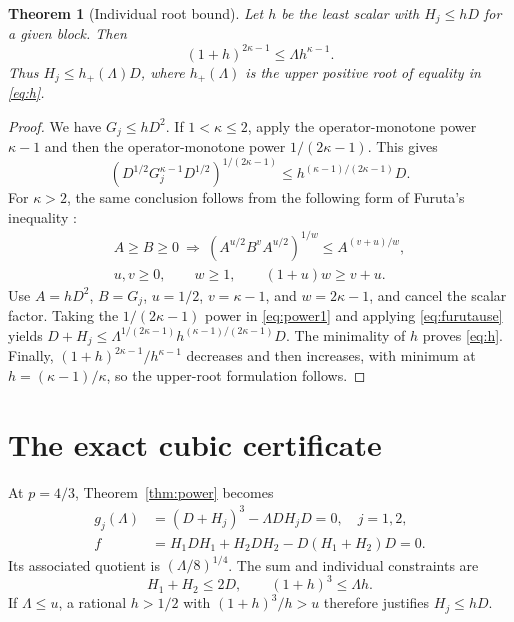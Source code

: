 \documentclass[11pt]{article}
\newtheorem{theorem}{Theorem}[section]
\theoremstyle{remark}\newtheorem{remark}[theorem]{Remark}
\begin{document}
\begin{theorem}[Individual root bound]\label{thm:individual}
Let \(h\) be the least scalar with \(H_j\le hD\) for a given block. Then
\begin{equation}\label{eq:h}
 (1+h)^{2\kappa-1}\le\Lambda h^{\kappa-1}.
\end{equation}
Thus \(H_j\le h_+(\Lambda)D\), where \(h_+(\Lambda)\) is the upper positive root of equality in \eqref{eq:h}.
\end{theorem}
\begin{proof}
We have \(G_j\le hD^2\). If \(1<\kappa\le2\), apply the operator-monotone power \(\kappa-1\) and then the operator-monotone power \(1/(2\kappa-1)\). This gives
\begin{equation}\label{eq:furutause}
 (D^{1/2}G_j^{\kappa-1}D^{1/2})^{1/(2\kappa-1)}
 \le h^{(\kappa-1)/(2\kappa-1)}D.
\end{equation}
For \(\kappa>2\), the same conclusion follows from the following form of Furuta's inequality \cite[Theorem F(ii)]{furuta}:
\[
 \begin{gathered}
 A\ge B\ge0\ \Longrightarrow\
 (A^{u/2}B^vA^{u/2})^{1/w}\le A^{(v+u)/w},\\
 u,v\ge0,\qquad w\ge1,\qquad(1+u)w\ge v+u.
 \end{gathered}
\]
Use \(A=hD^2\), \(B=G_j\), \(u=1/2\), \(v=\kappa-1\), and \(w=2\kappa-1\), and cancel the scalar factor. Taking the \(1/(2\kappa-1)\) power in \eqref{eq:power1} and applying \eqref{eq:furutause} yields
\(D+H_j\le\Lambda^{1/(2\kappa-1)}h^{(\kappa-1)/(2\kappa-1)}D\).
The minimality of \(h\) proves \eqref{eq:h}. Finally, \((1+h)^{2\kappa-1}/h^{\kappa-1}\) decreases and then increases, with minimum at \(h=(\kappa-1)/\kappa\), so the upper-root formulation follows.
\end{proof}

\section{The exact cubic certificate}
At \(p=4/3\), Theorem~\ref{thm:power} becomes
\begin{align}
 g_j(\Lambda)&=(D+H_j)^3-\Lambda DH_jD=0,\quad j=1,2,
 \label{eq:cubicg}\\
 f&=H_1DH_1+H_2DH_2-D(H_1+H_2)D=0.
 \label{eq:cubicf}
\end{align}
Its associated quotient is \((\Lambda/8)^{1/4}\). The sum and individual constraints are
\[
 H_1+H_2\le2D,\qquad (1+h)^3\le\Lambda h.
\]
If \(\Lambda\le u\), a rational \(h>1/2\) with \((1+h)^3/h>u\) therefore justifies \(H_j\le hD\).
\end{document}
